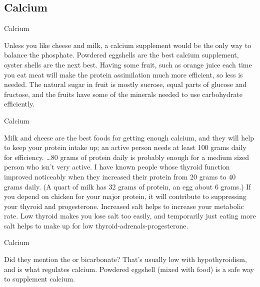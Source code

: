 \documentclass[11pt,oneside,openany,extrafontsizes]{memoir}
\begin{document}
\subsection{Calcium}

\begin{standalonequote}{Calcium}

    \begin{answer}
        Unless you like cheese and milk, a calcium supplement would be the only way to balance the phosphate. Powdered eggshells are the best calcium supplement, oyster shells are the next best. Having some fruit, such as orange juice each time you eat meat will make the protein assimilation much more efficient, so less is needed. The natural sugar in fruit is mostly sucrose, equal parts of glucose and fructose, and the fruits have some of the minerals needed to use carbohydrate efficiently.
    \end{answer}
\end{standalonequote}

\begin{standalonequote}{Calcium}

    \begin{answer}
        Milk and cheese are the best foods for getting enough calcium, and they will help to keep your protein intake up; an active person needs at least 100 grams daily for efficiency. \dots{}80 grams of protein daily is probably enough for a medium sized person who isn't very active. I have known people whose thyroid function improved noticeably when they increased their protein from 20 grams to 40 grams daily. (A quart of milk has 32 grams of protein, an egg about 6 grams.) If you depend on chicken for your major protein, it will contribute to suppressing your thyroid and progesterone. Increased salt helps to increase your metabolic rate. Low thyroid makes you lose salt too easily, and temporarily just eating more salt helps to make up for low thyroid-adrenals-progesterone.
    \end{answer}
\end{standalonequote}

\begin{standalonequote}{Calcium}

    \begin{answer}
        Did they mention the  or bicarbonate? That's usually low with hypothyroidism, and  is what regulates calcium. Powdered eggshell (mixed with food) is a safe way to supplement calcium.
    \end{answer}
\end{standalonequote}
\end{document}
